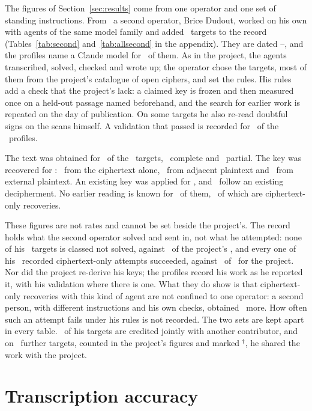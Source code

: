 \documentclass[11pt]{article}
\newif\ifanon
\newcommand{\Who}[2]{\ifanon #1\else #2\fi}
\begin{document}
The figures of Section~\ref{sec:results} come from one operator and one set of standing instructions. From \NBDateFirst\ a second operator, \Who{an independent researcher}{Brice Dudout}, worked on his own with agents of the same model family and added \NB\ targets to the record (Tables~\ref{tab:second} and~\ref{tab:allsecond} in the appendix). They are dated \NBYearMin--\NBYearMax, and the profiles name a Claude model for \NBclaude\ of them. As in the project, the agents transcribed, solved, checked and wrote up; the operator chose the targets, most of them from the project's catalogue of open ciphers, and set the rules. His rules add a check that the project's lack: a claimed key is frozen and then measured once on a held-out passage named beforehand, and the search for earlier work is repeated on the day of publication. On some targets he also re-read doubtful signs on the scans himself. A validation that passed is recorded for \NBheldout\ of the \NB\ profiles.

The text was obtained for \NBobtained\ of the \NB\ targets, \NBcomplete\ complete and \NBpartial\ partial. The key was recovered for \NBrecovered: \NBCT\ from the ciphertext alone, \NBAPT\ from adjacent plaintext and \NBEPT\ from external plaintext. An existing key was applied for \NBapplied, and \NBDEC\ follow an existing decipherment. No earlier reading is known for \NBclean\ of them, \NBcleanCT\ of which are ciphertext-only recoveries.

These figures are not rates and cannot be set beside the project's. The record holds what the second operator solved and sent in, not what he attempted: none of his \NB\ targets is classed not solved, against \NNS\ of the project's \Nworked, and every one of his \NBcto\ recorded ciphertext-only attempts succeeded, against \NctoCT\ of \Ncto\ for the project. Nor did the project re-derive his keys; the profiles record his work as he reported it, with his validation where there is one. What they do show is that ciphertext-only recoveries with this kind of agent are not confined to one operator: a second person, with different instructions and his own checks, obtained \NBCT\ more. How often such an attempt fails under his rules is not recorded. The two sets are kept apart in every table. \NBshared\ of his targets are credited jointly with another contributor, and on \NBmixed\ further targets, counted in the project's figures and marked $^\dagger$, he shared the work with the project.

\section{Transcription accuracy}
\label{sec:transcription}
\end{document}
